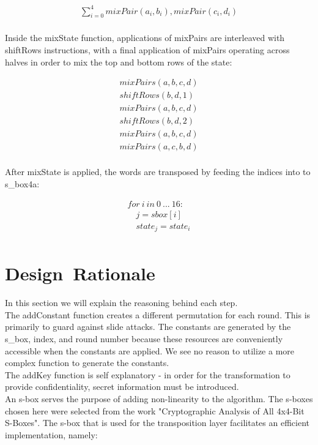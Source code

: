 \documentclass[preprint]{iacrtrans}
\begin{document}
\begin{align}
\displaystyle\sum_{i=0}^{4} mixPair(a_i, b_i), mixPair(c_i, d_i)\\
\end{align}

Inside the mixState function, applications of mixPairs are interleaved with shiftRows instructions, with a final application of mixPairs operating across halves in order to mix the top and bottom rows of the state:

\begin{align}
mixPairs(a, b, c, d)\\
shiftRows(b, d, 1) \\
mixPairs(a, b, c, d) \\
shiftRows(b, d, 2) \\
mixPairs(a, b, c, d) \\
mixPairs(a, c, b, d) \\
\end{align}

After mixState is applied, the words are transposed by feeding the indices into to s\_box4a:

\begin{align}
for\ i\ in\ 0\ ...\ 16:\\
	\quad j = sbox[i] \\
	\quad state_j = state_i \\
\end{align}

\section{Design\ Rationale}
In this section we will explain the reasoning behind each step. \\

The addConstant function creates a different permutation for each round. This is primarily to guard against slide attacks. The constants are generated by the s\_box, index, and round number because these resources are conveniently accessible when the constants are applied. We see no reason to utilize a more complex function to generate the constants. \\

The addKey function is self explanatory - in order for the transformation to provide confidentiality, secret information must be introduced. \\

An s-box serves the purpose of adding non-linearity to the algorithm. The s-boxes chosen here were selected from the work "Cryptographic Analysis of All 4x4-Bit S-Boxes". The s-box that is used for the transposition layer facilitates an efficient implementation, namely:
\end{document}
